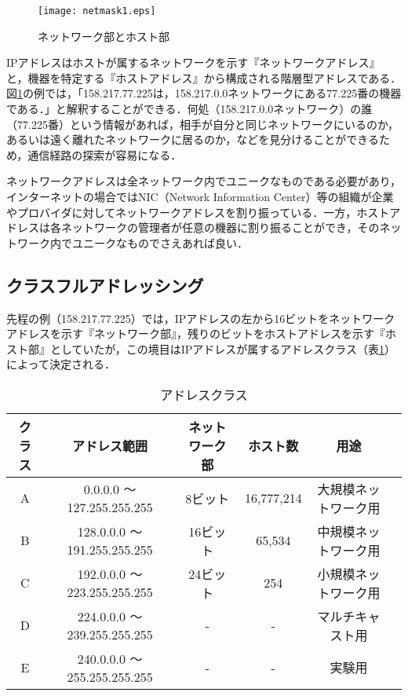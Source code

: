 \begin{figure}[htb]
  \begin{center}
    \texttt{[image: netmask1.eps]}　
  \end{center}
  \caption{ネットワーク部とホスト部}
  \label{fig:netmask1}
\end{figure}

IPアドレスはホストが属するネットワークを示す『ネットワークアドレス』と，機器を特定する『ホストアドレス』から構成される階層型アドレスである．図\ref{fig:netmask1}の例では，「158.217.77.225は，158.217.0.0ネットワークにある77.225番の機器である．」と解釈することができる．何処（158.217.0.0ネットワーク）の誰（77.225番）という情報があれば，相手が自分と同じネットワークにいるのか，あるいは遠く離れたネットワークに居るのか，などを見分けることができるため，通信経路の探索が容易になる．

ネットワークアドレスは全ネットワーク内でユニークなものである必要があり，インターネットの場合ではNIC（Network Information Center）等の組織が企業やプロバイダに対してネットワークアドレスを割り振っている．一方，ホストアドレスは各ネットワークの管理者が任意の機器に割り振ることができ，そのネットワーク内でユニークなものでさえあれば良い．

\subsection{クラスフルアドレッシング}

先程の例（158.217.77.225）では，IPアドレスの左から16ビットをネットワークアドレスを示す『ネットワーク部』，残りのビットをホストアドレスを示す『ホスト部』としていたが，この境目はIPアドレスが属するアドレスクラス（表\ref{tab:ip_class}）によって決定される．

\begin{table}[htb]
  \begin{center}
    \caption{アドレスクラス}
    \begin{tabular}{|c|c|c|c|c|c|} \hline
      クラス & アドレス範囲 & ネットワーク部 & ホスト数  & 用途 \\ \hline \hline
      A & 0.0.0.0 〜 127.255.255.255 & 8ビット & 16,777,214 & 大規模ネットワーク用  \\ \hline 
      B & 128.0.0.0 〜 191.255.255.255 & 16ビット & 65,534 & 中規模ネットワーク用  \\ \hline 
      C & 192.0.0.0 〜 223.255.255.255 & 24ビット & 254 & 小規模ネットワーク用 \\ \hline 
      D & 224.0.0.0 〜 239.255.255.255 & - & - & マルチキャスト用 \\ \hline 
      E & 240.0.0.0 〜 255.255.255.255 & -  & - & 実験用 \\ \hline 
    \end{tabular}
    \label{tab:ip_class}
  \end{center}
\end{table}

